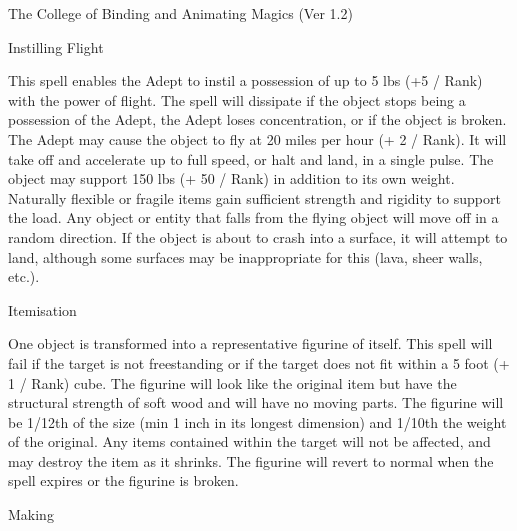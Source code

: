 \begin{Chapter}{The College of Binding and Animating Magics (Ver 1.2)}
\begin{spell}[S-6]{Instilling Flight}
\begin{effects}
This spell enables the Adept to instil a possession of up to 5 lbs (+5
/ Rank) with the power of flight.  The spell will dissipate if the
object stops being a possession of the Adept, the Adept loses
concentration, or if the object is broken.  The Adept may cause the
object to fly at 20 miles per hour (+ 2 / Rank).  It will take off and
accelerate up to full speed, or halt and land, in a single pulse. The
object may support 150 lbs (+ 50 / Rank) in addition to its own
weight.  Naturally flexible or fragile items gain sufficient strength
and rigidity to support the load.  Any object or entity that falls
from the flying object will move off in a random direction.  If the
object is about to crash into a surface, it will attempt to land,
although some surfaces may be inappropriate for this (lava, sheer
walls, etc.).
\end{effects}
\end{spell}

\begin{spell}[S-7]{Itemisation}
\begin{effects}
One object is transformed into a representative figurine of itself.
This spell will fail if the target is not freestanding or if the
target does not fit within a 5 foot (+ 1 / Rank) cube. The figurine
will look like the original item but have the structural strength of
soft wood and will have no moving parts. The figurine will be 1/12th
of the size (min 1 inch in its longest dimension) and 1/10th the
weight of the original. Any items contained within the target will not
be affected, and may destroy the item as it shrinks.  The figurine
will revert to normal when the spell expires or the figurine is
broken.
\end{effects}
\end{spell}

\begin{spell}[S-8]{Making}


\end{spell}
\end{Chapter}
